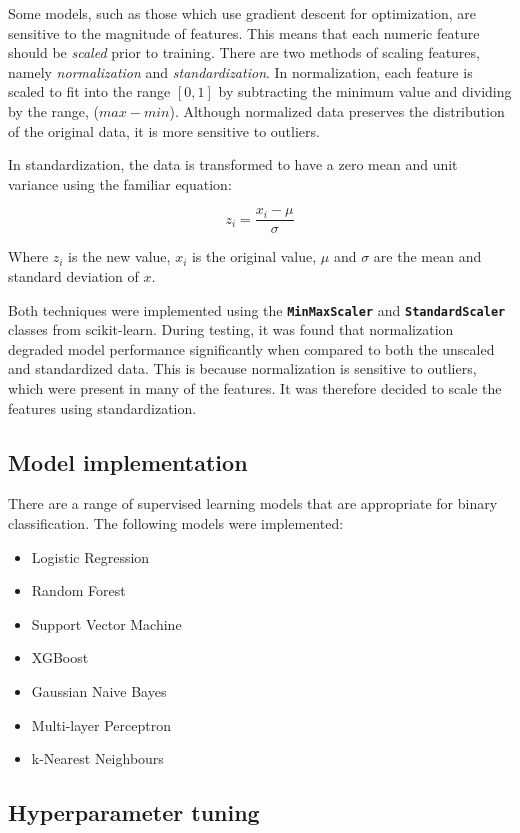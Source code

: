 Some models, such as those which use gradient descent for optimization, are sensitive to the magnitude of features. This means that each numeric feature should be \textit{scaled} prior to training. There are two methods of scaling features, namely \textit{normalization} and \textit{standardization}. In normalization, each feature is scaled to fit into the range $[0, 1]$ by subtracting the minimum value and dividing by the range, ($max-min$). Although normalized data preserves the distribution of the original data, it is more sensitive to outliers. 

In standardization, the data is transformed to have a zero mean and unit variance using the familiar equation:

\[ z_i = \frac{x_i-\mu}{\sigma} \]

Where $z_i$ is the new value, $x_i$ is the original value, $\mu$ and $\sigma$ are the mean and standard deviation of $x$.

Both techniques were implemented using the \texttt{\textbf{MinMaxScaler}} and \texttt{\textbf{StandardScaler}} classes from scikit-learn. During testing, it was found that normalization degraded model performance significantly when compared to both the unscaled and standardized data. This is because normalization is sensitive to outliers, which were present in many of the features. It was therefore decided to scale the features using standardization. 

\subsection{Model implementation}

There are a range of supervised learning models that are appropriate for binary classification. The following models were implemented:

\begin{itemize}
	\item Logistic Regression
	\item Random Forest
	\item Support Vector Machine
	\item XGBoost
	\item Gaussian Naive Bayes
	\item Multi-layer Perceptron
	\item k-Nearest Neighbours
\end{itemize}

\subsection{Hyperparameter tuning}

